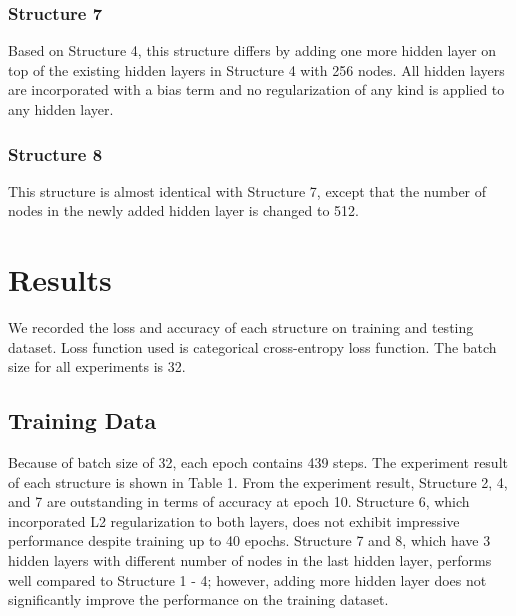 \documentclass{article}
\begin{document}
\subsubsection{Structure 7}

Based on Structure 4, this structure differs by adding one more hidden layer on top of the existing hidden layers in Structure 4 with 256 nodes. All hidden layers are incorporated with a bias term and no regularization of any kind is applied to any hidden layer.

\subsubsection{Structure 8}

This structure is almost identical with Structure 7, except that the number of nodes in the newly added hidden layer is changed to 512.

\subsection{}


\section{Results}
We recorded the loss and accuracy of each structure on training and testing dataset. Loss function used is categorical cross-entropy loss function. The batch size for all experiments is 32. 

\subsection{Training Data}
Because of batch size of 32, each epoch contains 439 steps. The experiment result of each structure is shown in Table 1. From the experiment result, Structure 2, 4, and 7 are outstanding in terms of accuracy at epoch 10. Structure 6, which incorporated L2 regularization to both layers, does not exhibit impressive performance despite training up to 40 epochs. Structure 7 and 8, which have 3 hidden layers with different number of nodes in the last hidden layer, performs well compared to Structure 1 - 4; however, adding more hidden layer does not significantly improve the performance on the training dataset.
\end{document}
